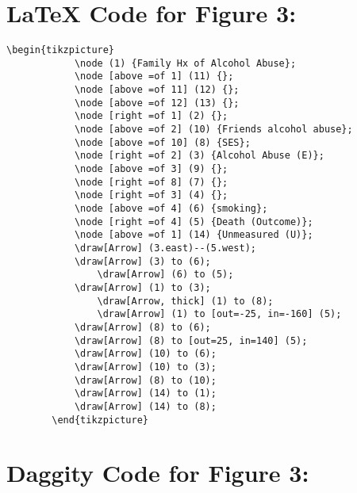 \documentclass{article}
\begin{document}
\section*{\LaTeX\hspace*{1mm} Code for Figure 3:}
    \begin{lstlisting}[frame=single, basicstyle=\ttfamily]
        \begin{tikzpicture}
            \node (1) {Family Hx of Alcohol Abuse};
            \node [above =of 1] (11) {};
            \node [above =of 11] (12) {};
            \node [above =of 12] (13) {};
            \node [right =of 1] (2) {};
            \node [above =of 2] (10) {Friends alcohol abuse};
            \node [above =of 10] (8) {SES};
            \node [right =of 2] (3) {Alcohol Abuse (E)};
            \node [above =of 3] (9) {};
            \node [right =of 8] (7) {};
            \node [right =of 3] (4) {};
            \node [above =of 4] (6) {smoking};
            \node [right =of 4] (5) {Death (Outcome)};
            \node [above =of 1] (14) {Unmeasured (U)};
            \draw[Arrow] (3.east)--(5.west);
            \draw[Arrow] (3) to (6);
                \draw[Arrow] (6) to (5);
            \draw[Arrow] (1) to (3);
                \draw[Arrow, thick] (1) to (8);
                \draw[Arrow] (1) to [out=-25, in=-160] (5);
            \draw[Arrow] (8) to (6);
            \draw[Arrow] (8) to [out=25, in=140] (5);
            \draw[Arrow] (10) to (6);
            \draw[Arrow] (10) to (3);
            \draw[Arrow] (8) to (10);
            \draw[Arrow] (14) to (1);
            \draw[Arrow] (14) to (8);
        \end{tikzpicture}
\end{lstlisting}
   

\section*{Daggity Code for Figure 3:}
\begin{lstlisting}[frame=single, basicstyle=\ttfamily]

\end{lstlisting}
\end{document}
